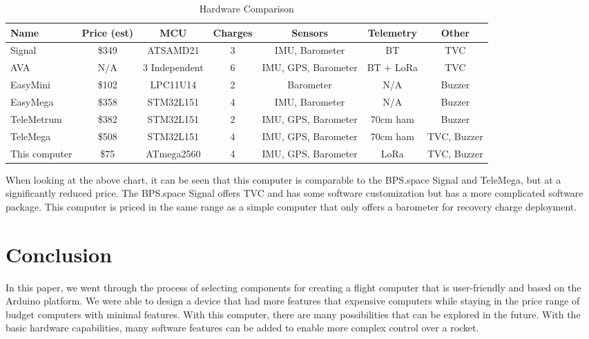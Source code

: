 \documentclass[conf]{new-aiaa}
\begin{document}
 \begin{table}[H]
 \caption{\label{tab:computers} Hardware Comparison}
 \centering
 \begin{tabular}{lcccccc}
 
 \hline Name & Price (est) & MCU & Charges & Sensors & Telemetry & Other\\ \hline
 
 Signal\cite{bpssignal} & \$349 & ATSAMD21 & 3 & IMU, Barometer & BT\footnotemark[2] & TVC \\
 AVA\cite{ava} & N/A\footnotemark[3] & 3 Independent & 6 & IMU, GPS, Barometer & BT + LoRa & TVC \\
 EasyMini\cite{easymini} & \$102\cite{easyminiapogee} & LPC11U14 & 2 & Barometer & N/A & Buzzer \\
 EasyMega\cite{easymega} & \$358\cite{easymegaapogee} & STM32L151 & 4 & IMU, Barometer & N/A & Buzzer \\
 TeleMetrum\cite{telemetrum} & \$382\cite{telemetrumapogee} & STM32L151 & 2 & IMU, GPS, Barometer & 70cm ham & Buzzer \\
 TeleMega\cite{telemega} & \$508\cite{telemegaapogee} & STM32L151 & 4 & IMU, GPS, Barometer & 70cm ham & TVC, Buzzer \\
 This computer & \$75\footnotemark[1] & ATmega2560 & 4 & IMU, GPS, Barometer & LoRa & TVC, Buzzer \\
 
 \hline
 \end{tabular}
 \end{table}

 When looking at the above chart, it can be seen that this computer is comparable to the BPS.space Signal and TeleMega, but at a significantly reduced price. The BPS.space Signal offers TVC and has some software customization but has a more complicated software package. This computer is priced in the same range as a simple computer that only offers a barometer for recovery charge deployment.


\section{Conclusion}

In this paper, we went through the process of selecting components for creating a flight computer that is user-friendly and based on the Arduino platform. We were able to design a device that had more features that expensive computers while staying in the price range of budget computers with minimal features. With this computer, there are many possibilities that can be explored in the future. With the basic hardware capabilities, many software features can be added to enable more complex control over a rocket. 

\pagebreak

\end{document}
